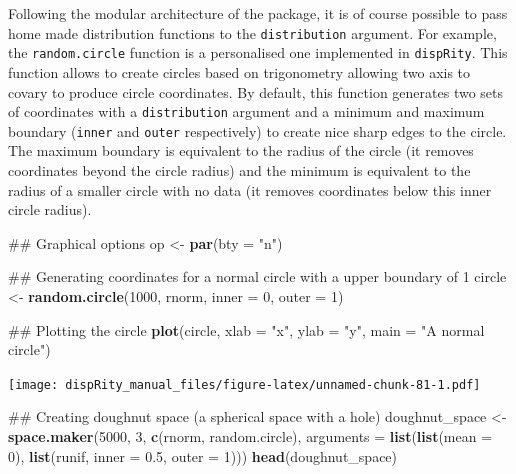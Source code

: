 \documentclass[]{book}
\newenvironment{Shaded}{\begin{snugshade}}{\end{snugshade}}
\newcommand{\KeywordTok}[1]{\textcolor[rgb]{0.13,0.29,0.53}{\textbf{#1}}}
\newcommand{\DataTypeTok}[1]{\textcolor[rgb]{0.13,0.29,0.53}{#1}}
\newcommand{\DecValTok}[1]{\textcolor[rgb]{0.00,0.00,0.81}{#1}}
\newcommand{\FloatTok}[1]{\textcolor[rgb]{0.00,0.00,0.81}{#1}}
\newcommand{\StringTok}[1]{\textcolor[rgb]{0.31,0.60,0.02}{#1}}
\newcommand{\NormalTok}[1]{#1}
\theoremstyle{definition}
\theoremstyle{definition}
\theoremstyle{remark}
\begin{document}
Following the modular architecture of the package, it is of course
possible to pass home made distribution functions to the
\texttt{distribution} argument. For example, the \texttt{random.circle}
function is a personalised one implemented in \texttt{dispRity}. This
function allows to create circles based on trigonometry allowing two
axis to covary to produce circle coordinates. By default, this function
generates two sets of coordinates with a \texttt{distribution} argument
and a minimum and maximum boundary (\texttt{inner} and \texttt{outer}
respectively) to create nice sharp edges to the circle. The maximum
boundary is equivalent to the radius of the circle (it removes
coordinates beyond the circle radius) and the minimum is equivalent to
the radius of a smaller circle with no data (it removes coordinates
below this inner circle radius).

\begin{Shaded}
\begin{Highlighting}[]
\NormalTok{## Graphical options}
\NormalTok{op <-}\StringTok{ }\KeywordTok{par}\NormalTok{(}\DataTypeTok{bty =} \StringTok{"n"}\NormalTok{)}

\NormalTok{## Generating coordinates for a normal circle with a upper boundary of 1}
\NormalTok{circle <-}\StringTok{ }\KeywordTok{random.circle}\NormalTok{(}\DecValTok{1000}\NormalTok{, rnorm, }\DataTypeTok{inner =} \DecValTok{0}\NormalTok{, }\DataTypeTok{outer =} \DecValTok{1}\NormalTok{)}

\NormalTok{## Plotting the circle}
\KeywordTok{plot}\NormalTok{(circle, }\DataTypeTok{xlab =} \StringTok{"x"}\NormalTok{, }\DataTypeTok{ylab =} \StringTok{"y"}\NormalTok{, }\DataTypeTok{main =} \StringTok{"A normal circle"}\NormalTok{)}
\end{Highlighting}
\end{Shaded}

\texttt{[image: dispRity\_manual\_files/figure-latex/unnamed-chunk-81-1.pdf]}

\begin{Shaded}
\begin{Highlighting}[]
\NormalTok{## Creating doughnut space (a spherical space with a hole)}
\NormalTok{doughnut_space <-}\StringTok{ }\KeywordTok{space.maker}\NormalTok{(}\DecValTok{5000}\NormalTok{, }\DecValTok{3}\NormalTok{, }\KeywordTok{c}\NormalTok{(rnorm, random.circle),}
     \DataTypeTok{arguments =} \KeywordTok{list}\NormalTok{(}\KeywordTok{list}\NormalTok{(}\DataTypeTok{mean =} \DecValTok{0}\NormalTok{), }\KeywordTok{list}\NormalTok{(runif, }\DataTypeTok{inner =} \FloatTok{0.5}\NormalTok{, }\DataTypeTok{outer =} \DecValTok{1}\NormalTok{)))}
\KeywordTok{head}\NormalTok{(doughnut_space)}
\end{Highlighting}
\end{Shaded}
\end{document}
